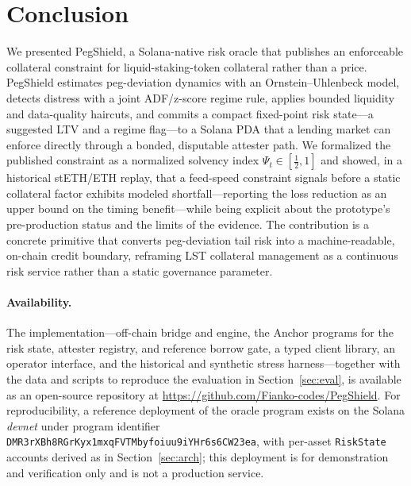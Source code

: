 \documentclass[aps,prx,reprint,nofootinbib,longbibliography]{revtex4-2}
\begin{document}
\section{Conclusion}
\label{sec:conclusion}

We presented PegShield, a Solana-native risk oracle that publishes an enforceable
collateral constraint for liquid-staking-token collateral rather than a price.
PegShield estimates peg-deviation dynamics with an Ornstein--Uhlenbeck model,
detects distress with a joint ADF/z-score regime rule, applies bounded liquidity
and data-quality haircuts, and commits a compact fixed-point risk state---a
suggested LTV and a regime flag---to a Solana PDA that a lending market can enforce
directly through a bonded, disputable attester path. We formalized the published
constraint as a normalized solvency index $\Psi_t\in[\tfrac12,1]$ and showed, in a
historical stETH/ETH replay, that a feed-speed constraint signals before a static
collateral factor exhibits modeled shortfall---reporting the loss reduction as an
upper bound on the timing benefit---while being explicit about the
prototype's pre-production status and the limits of the evidence. The contribution
is a concrete primitive that converts peg-deviation tail risk into a
machine-readable, on-chain credit boundary, reframing LST collateral management as a
continuous risk service rather than a static governance parameter.

\paragraph{Availability.}
The implementation---off-chain bridge and engine, the Anchor programs for the risk
state, attester registry, and reference borrow gate, a typed client library, an
operator interface, and the historical and synthetic stress harness---together with
the data and scripts to reproduce the evaluation in Section~\ref{sec:eval}, is
available as an open-source repository at
\url{https://github.com/Fianko-codes/PegShield}. For reproducibility, a reference
deployment of the oracle program exists on the Solana \emph{devnet} under program
identifier \texttt{DMR3rXBh8RGrKyx1mxqFVTMbyfoiuu9iYHr6s6CW23ea}, with per-asset
\texttt{RiskState} accounts derived as in Section~\ref{sec:arch}; this deployment is
for demonstration and verification only and is not a production service.


\end{document}
